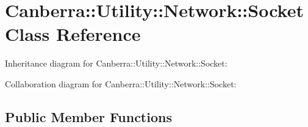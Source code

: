 \hypertarget{class_canberra_1_1_utility_1_1_network_1_1_socket}{}\section{Canberra\+:\+:Utility\+:\+:Network\+:\+:Socket Class Reference}
\label{class_canberra_1_1_utility_1_1_network_1_1_socket}


Inheritance diagram for Canberra\+:\+:Utility\+:\+:Network\+:\+:Socket\+:


Collaboration diagram for Canberra\+:\+:Utility\+:\+:Network\+:\+:Socket\+:
\subsection*{Public Member Functions}
